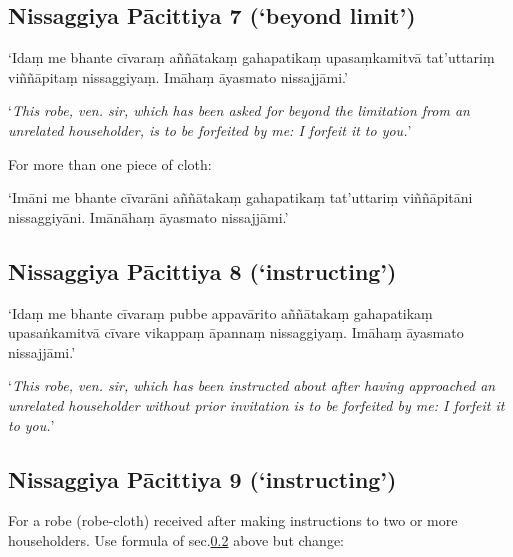 
\subsection[NP 7 (‘beyond limit’)]{Nissaggiya Pācittiya 7 (‘beyond limit’)}

‘Idaṃ me bhante cīvaraṃ aññātakaṃ gahapatikaṃ upasaṃkamitvā tat'uttariṃ
viññāpitaṃ nissaggiyaṃ. Imāhaṃ āyasmato nissajjāmi.’

‘\emph{This robe, ven. sir, which has been asked for beyond the limitation from
  an unrelated householder, is to be forfeited by me: I forfeit it to you.}’

For more than one piece of cloth:

‘Imāni me bhante cīvarāni aññātakaṃ gahapatikaṃ tat'uttariṃ viññāpitāni
nissaggiyāni. Imānāhaṃ āyasmato nissajjāmi.’


\subsection[NP 8 (‘instructing’)]{Nissaggiya Pācittiya 8 (‘instructing’)}
\label{np-8-instructing}

‘Idaṃ me bhante cīvaraṃ pubbe appavārito aññātakaṃ gahapatikaṃ upasaṅkamitvā
cīvare vikappaṃ āpannaṃ nissaggiyaṃ. Imāhaṃ āyasmato nissajjāmi.’

‘\emph{This robe, ven. sir, which has been instructed about after having
  approached an unrelated householder without prior invitation is to be
  forfeited by me: I forfeit it to you.}’ 


\subsection[NP 9 (‘instructing’)]{Nissaggiya Pācittiya 9 (‘instructing’)}

For a robe (robe-cloth) received after making instructions to two or more
householders. Use formula of sec.\ref{np-8-instructing} above but change:

